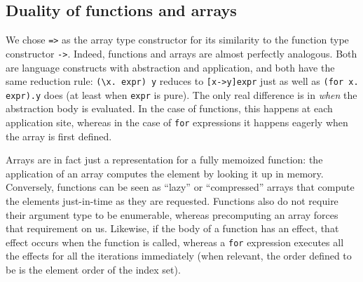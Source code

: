 \documentclass[acmsmall,screen,nonacm]{acmart}
\newcommand{\ttt}[1]{\texttt{#1}}
\begin{document}
\subsection{Duality of functions and arrays}
\label{sec:function-array-duality}

We chose \texttt{=>} as the array type constructor for its similarity to the function type constructor \texttt{->}.
Indeed, functions and arrays are almost perfectly analogous. Both are language constructs with abstraction and application, and both have the same reduction rule:
 \verb|(\x. expr) y| reduces to \verb|[x->y]expr| just as well as \verb|(for x. expr).y| does (at least when \ttt{expr} is pure).
The only real difference is in \emph{when} the abstraction body is evaluated.
In the case of functions, this happens at each application site, whereas in the case of \ttt{for} expressions it happens eagerly when the array is first defined.

Arrays are in fact just a representation for a fully memoized function: the application of an array computes the element by looking it up in memory.
Conversely, functions can be seen as ``lazy'' or ``compressed'' arrays that compute the elements just-in-time as they are requested.
Functions also do not require their argument type to be enumerable, whereas precomputing an array forces that requirement on us.
Likewise, if the body of a function has an effect, that effect occurs when the function is called, whereas a \ttt{for} expression executes all the effects for all the iterations immediately (when relevant, the order defined to be is the element order of the index set).
\end{document}
